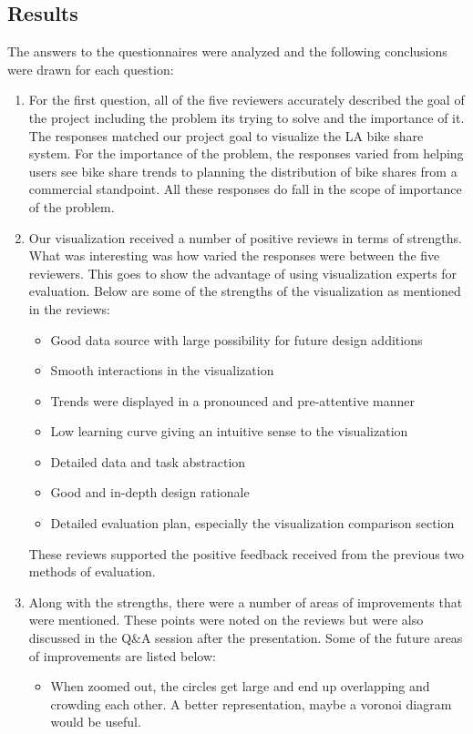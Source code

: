 \subsection{Results}
The answers to the questionnaires were analyzed and the following conclusions were drawn for each question:
\begin{enumerate}
	\item For the first question, all of the five reviewers accurately described the goal of the project including the problem its trying to solve and the importance of it. The responses matched our project goal to visualize the LA bike share system. For the importance of the problem, the responses varied from helping users see bike share trends to planning the distribution of bike shares from a commercial standpoint. All these responses do fall in the scope of importance of the problem.
	\item Our visualization received a number of positive reviews in terms of strengths. What was interesting was how varied the responses were between the five reviewers. This goes to show the advantage of using visualization experts for evaluation. Below are some of the strengths of the visualization as mentioned in the reviews:
	\begin{itemize}
		\item Good data source with large possibility for future design additions
		\item Smooth interactions in the visualization
		\item Trends were displayed in a pronounced and pre-attentive manner
		\item Low learning curve giving an intuitive sense to the visualization
		\item Detailed data and task abstraction
		\item Good and in-depth design rationale
		\item Detailed evaluation plan, especially the visualization comparison section
	\end{itemize}
	These reviews supported the positive feedback received from the previous two methods of evaluation.
	\item Along with the strengths, there were a number of areas of improvements that were mentioned. These points were noted on the reviews but were also discussed in the Q\&A session after the presentation. Some of the future areas of improvements are listed below:
	\begin{itemize}
		\item When zoomed out, the circles get large and end up overlapping and crowding each other. A better representation, maybe a voronoi diagram would be useful.

\end{itemize}
\end{enumerate}
